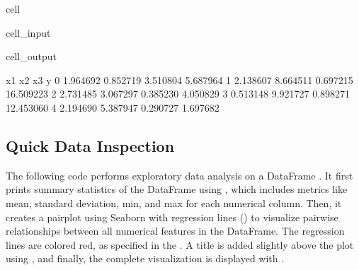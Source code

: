 \documentclass[letterpaper,10pt,english]{jupyterBook}
\begin{document}
\begin{sphinxuseclass}{cell}
\begin{sphinxVerbatimInput}
\begin{sphinxuseclass}{cell_input}
\begin{sphinxVerbatim}[commandchars=\\\{\}]
    
\PYG{p}{[}\PYG{p}{]}    

\end{sphinxVerbatim}

\end{sphinxuseclass}\end{sphinxVerbatimInput}
\begin{sphinxVerbatimOutput}

\begin{sphinxuseclass}{cell_output}
\begin{sphinxVerbatim}[commandchars=\\\{\}]
         x1        x2        x3          y
0  1.964692  0.852719 \PYGZhy{}3.510804   5.687964
1 \PYGZhy{}2.138607 \PYGZhy{}8.664511 \PYGZhy{}0.697215  16.509223
2 \PYGZhy{}2.731485  3.067297 \PYGZhy{}0.385230  \PYGZhy{}4.050829
3  0.513148  9.921727  0.898271 \PYGZhy{}12.453060
4  2.194690  5.387947 \PYGZhy{}0.290727  \PYGZhy{}1.697682
\end{sphinxVerbatim}

\end{sphinxuseclass}\end{sphinxVerbatimOutput}

\end{sphinxuseclass}

\subsection{Quick Data Inspection}
\label{\detokenize{02:quick-data-inspection}}
\sphinxAtStartPar
The following code performs exploratory data analysis on a DataFrame . It first prints summary statistics of the DataFrame using , which includes metrics like mean, standard deviation, min, and max for each numerical column. Then, it creates a pairplot using Seaborn with regression lines () to visualize pairwise relationships between all numerical features in the DataFrame. The regression lines are colored red, as specified in the . A title is added slightly above the plot using , and finally, the complete visualization is displayed with .
\end{document}
